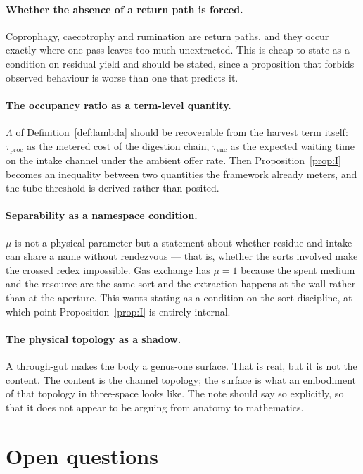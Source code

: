 \documentclass[11pt]{article}
\theoremstyle{plain}
\theoremstyle{definition}
\begin{document}
\paragraph{Whether the absence of a return path is forced.} Coprophagy, caecotrophy and rumination are
return paths, and they occur exactly where one pass leaves too much unextracted. This is cheap to state
as a condition on residual yield and should be stated, since a proposition that forbids observed
behaviour is worse than one that predicts it.

\paragraph{The occupancy ratio as a term-level quantity.} $\Lambda$ of
Definition~\ref{def:lambda} should be recoverable from the harvest term itself: $\tau_{\mathrm{proc}}$
as the metered cost of the digestion chain, $\tau_{\mathrm{enc}}$ as the expected waiting time on the
intake channel under the ambient offer rate. Then Proposition~\ref{prop:I} becomes an inequality
between two quantities the framework already meters, and the tube threshold is derived rather than
posited.

\paragraph{Separability as a namespace condition.} $\mu$ is not a physical parameter but a statement
about whether residue and intake can share a name without rendezvous --- that is, whether the sorts
involved make the crossed redex impossible. Gas exchange has $\mu = 1$ because the spent medium and
the resource are the same sort and the extraction happens at the wall rather than at the aperture.
This wants stating as a condition on the sort discipline, at which point Proposition~\ref{prop:I} is
entirely internal.

\paragraph{The physical topology as a shadow.} A through-gut makes the body a genus-one surface. That
is real, but it is not the content. The content is the channel topology; the surface is what an
embodiment of that topology in three-space looks like. The note should say so explicitly, so that it
does not appear to be arguing from anatomy to mathematics.

\section{Open questions}
\label{sec:open}
\end{document}
